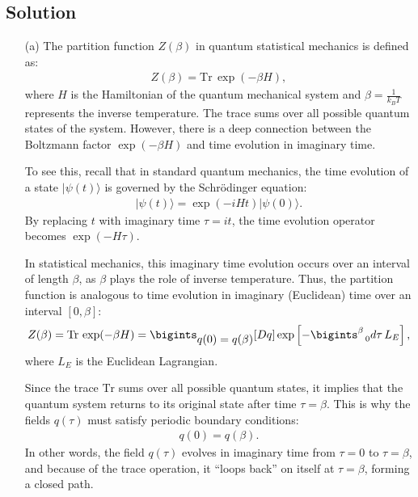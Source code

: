 \subsection*{Solution}
\begin{enumerate}
    \item [(a)] The partition function $Z(\beta)$ in quantum statistical mechanics is defined as:
    \begin{align}
        Z(\beta) = \text{Tr} \, \exp(-\beta H),
    \end{align}
    where $H$ is the Hamiltonian of the quantum mechanical system and $\displaystyle\beta = \frac{1}{k_B T}$ represents the inverse temperature. The trace sums over all possible quantum states of the system. However, there is a deep connection between the Boltzmann factor $\exp(-\beta H)$ and time evolution in imaginary time.
    
    To see this, recall that in standard quantum mechanics, the time evolution of a state $| \psi(t) \rangle$ is governed by the Schrödinger equation:
    \begin{align*}
        | \psi(t) \rangle = \exp(-i H t) | \psi(0) \rangle.
    \end{align*}
    By replacing $t$ with imaginary time $\tau = i t$, the time evolution operator becomes $\exp(-H \tau)$. 
    
    In statistical mechanics, this imaginary time evolution occurs over an interval of length $\beta$, as $\beta$ plays the role of inverse temperature. Thus, the partition function is analogous to time evolution in imaginary (Euclidean) time over an interval $[0, \beta]$:
    \begin{align}
        Z(\beta) = \text{Tr} \, \exp(-\beta H) = \bigints_{\displaystyle q(0) = q(\beta)} [Dq] \exp \left[ - \bigints_{~~0}^{\beta} d\tau \, L_E \right],
    \end{align}
    where $L_E$ is the Euclidean Lagrangian.

    Since the trace $\text{Tr}$ sums over all possible quantum states, it implies that the quantum system returns to its original state after time $\tau = \beta$. This is why the fields $q(\tau)$ must satisfy periodic boundary conditions:
    \begin{align}
        q(0) = q(\beta).
    \end{align}
    In other words, the field $q(\tau)$ evolves in imaginary time from $\tau = 0$ to $\tau = \beta$, and because of the trace operation, it “loops back” on itself at $\tau = \beta$, forming a closed path.
    

\end{enumerate}
